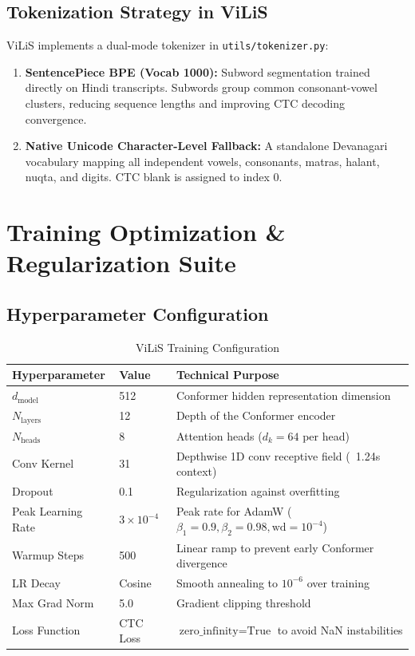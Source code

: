 \documentclass[11pt,a4paper]{article}
\begin{document}
\subsection{Tokenization Strategy in ViLiS}
ViLiS implements a dual-mode tokenizer in \texttt{utils/tokenizer.py}:
\begin{enumerate}
    \item \textbf{SentencePiece BPE (Vocab 1000):} Subword segmentation trained directly on Hindi transcripts. Subwords group common consonant-vowel clusters, reducing sequence lengths and improving CTC decoding convergence.
    \item \textbf{Native Unicode Character-Level Fallback:} A standalone Devanagari vocabulary mapping all independent vowels, consonants, matras, halant, nuqta, and digits. CTC blank is assigned to index 0.
\end{enumerate}

\section{Training Optimization \& Regularization Suite}
\subsection{Hyperparameter Configuration}
\begin{table}[h]
\centering
\begin{tabular}{lll}
\toprule
\textbf{Hyperparameter} & \textbf{Value} & \textbf{Technical Purpose} \\
\midrule
$d_{\text{model}}$ & 512 & Conformer hidden representation dimension \\
$N_{\text{layers}}$ & 12 & Depth of the Conformer encoder \\
$N_{\text{heads}}$ & 8 & Attention heads ($d_k = 64$ per head) \\
Conv Kernel & 31 & Depthwise 1D conv receptive field (~1.24s context) \\
Dropout & 0.1 & Regularization against overfitting \\
Peak Learning Rate & $3 \times 10^{-4}$ & Peak rate for AdamW ($\beta_1=0.9, \beta_2=0.98, \text{wd}=10^{-4}$) \\
Warmup Steps & 500 & Linear ramp to prevent early Conformer divergence \\
LR Decay & Cosine & Smooth annealing to $10^{-6}$ over training \\
Max Grad Norm & 5.0 & Gradient clipping threshold \\
Loss Function & CTC Loss & $\text{zero\_infinity}=\text{True}$ to avoid NaN instabilities \\
\bottomrule
\end{tabular}
\caption{ViLiS Training Configuration}
\end{table}
\end{document}
